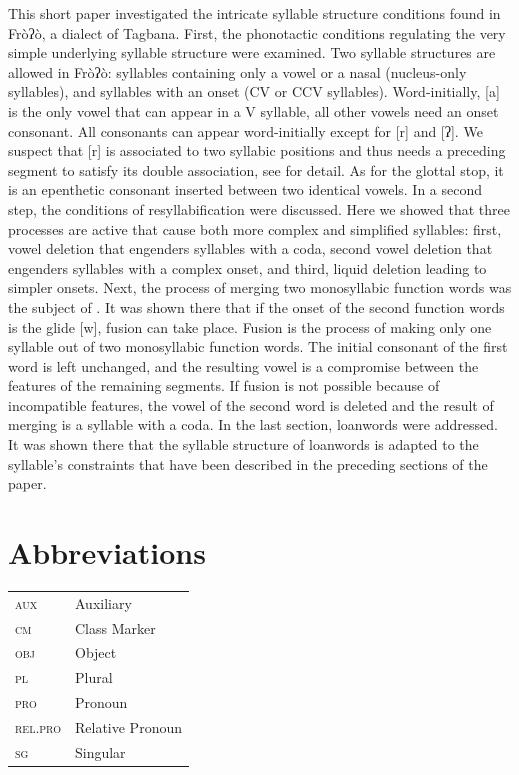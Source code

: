 \documentclass[output=paper]{langscibook}
\begin{document}
This short paper investigated the intricate syllable structure conditions found in Fròʔò, a dialect of Tagbana. First, the phonotactic conditions regulating the very simple underlying syllable structure were examined. Two syllable structures are allowed in Fròʔò: syllables containing only a vowel or a nasal (nucleus-only syllables), and syllables with an onset (CV or CCV syllables). Word-initially, [a] is the only vowel that can appear in a V syllable, all other vowels need an onset consonant. All consonants can appear word-initially except for [r] and [ʔ]. We suspect that [r] is associated to two syllabic positions and thus needs a preceding segment to satisfy its double association, see \cite{FanselowTBA} for detail. As for the glottal stop, it is an epenthetic consonant inserted between two identical vowels. In a second step, the conditions of resyllabification were discussed. Here we showed that three processes are active that cause both more complex and simplified syllables: first, vowel deletion that engenders syllables with a coda, second vowel deletion that engenders syllables with a complex onset, and third, liquid deletion leading to simpler onsets. Next, the process of merging two monosyllabic function words was the subject of . It was shown there that if the onset of the second function words is the glide [w], fusion can take place. Fusion is the process of making only one syllable out of two monosyllabic function words. The initial consonant of the first word is left unchanged, and the resulting vowel is a compromise between the features of the remaining segments. If fusion is not possible because of incompatible features, the vowel of the second word is deleted and the result of merging is a syllable with a coda. In the last section, loanwords were addressed. It was shown there that the syllable structure of loanwords is adapted to the syllable’s constraints that have been described in the preceding sections of the paper.  

\section*{Abbreviations}
\noindent\begin{tabularx}{.8\textwidth}{@{}>{\scshape}lQ@{}}
aux & Auxiliary\\
cm & Class Marker\\
obj & Object\\
pl & Plural\\
pro & Pronoun\\
rel.pro & Relative Pronoun\\
sg & Singular\\
\end{tabularx}
\end{document}
